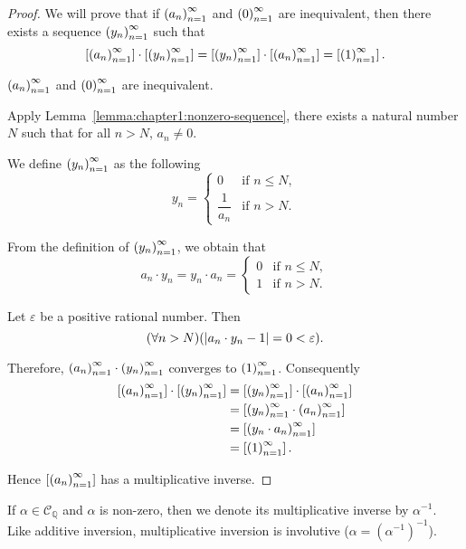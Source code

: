 \begin{proof}
    We will prove that if ${\left({a_{n}}\right)}^{\infty}_{n=1}$ and ${\left({0}\right)}^{\infty}_{n=1}$ are inequivalent, then there exists a sequence ${\left({y_{n}}\right)}^{\infty}_{n=1}$ such that
    \[
        \left[{{\left({a_{n}}\right)}^{\infty}_{n=1}}\right]\cdot\left[{{\left({y_{n}}\right)}^{\infty}_{n=1}}\right] = \left[{{\left({y_{n}}\right)}^{\infty}_{n=1}}\right]\cdot\left[{{\left({a_{n}}\right)}^{\infty}_{n=1}}\right] = \left[{{\left({1}\right)}^{\infty}_{n=1}}\right].
    \]

    ${\left({a_{n}}\right)}^{\infty}_{n=1}$ and ${\left({0}\right)}^{\infty}_{n=1}$ are inequivalent.

    Apply Lemma~\ref{lemma:chapter1:nonzero-sequence}, there exists a natural number $N$ such that for all $n > N$, $a_{n}\ne 0$.

    We define ${\left({y_{n}}\right)}^{\infty}_{n=1}$ as the following
    \[
        y_{n} = \begin{cases}
            0                & \text{if $n\le N$}, \\
            \dfrac{1}{a_{n}} & \text{if $n > N$}.
        \end{cases}
    \]

    From the definition of ${\left({y_{n}}\right)}^{\infty}_{n=1}$, we obtain that
    \[
        a_{n}\cdot y_{n} = y_{n}\cdot a_{n} = \begin{cases}
            0 & \text{if $n\le N$}, \\
            1 & \text{if $n > N$}.
        \end{cases}
    \]

    Let $\varepsilon$ be a positive rational number. Then
    \[
        (\forall n > N)(\left\vert{a_{n}\cdot y_{n} - 1}\right\vert = 0 < \varepsilon).
    \]

    Therefore, ${\left({a_{n}}\right)}^{\infty}_{n=1}\cdot {\left({y_{n}}\right)}^{\infty}_{n=1}$ converges to ${\left({1}\right)}^{\infty}_{n=1}$. Consequently
    \begin{align*}
        \left[{{\left({a_{n}}\right)}^{\infty}_{n=1}}\right]\cdot\left[{{\left({y_{n}}\right)}^{\infty}_{n=1}}\right] & = \left[{{\left({y_{n}}\right)}^{\infty}_{n=1}}\right]\cdot\left[{{\left({a_{n}}\right)}^{\infty}_{n=1}}\right] \\
                                                    & = \left[{{\left({y_{n}}\right)}^{\infty}_{n=1}\cdot{\left({a_{n}}\right)}^{\infty}_{n=1}}\right]         \\
                                                    & = \left[{{\left({y_{n}\cdot a_{n}}\right)}^{\infty}_{n=1}}\right]              \\
                                                    & = \left[{{\left({1}\right)}^{\infty}_{n=1}}\right].
    \end{align*}

    Hence $\left[{{\left({a_{n}}\right)}^{\infty}_{n=1}}\right]$ has a multiplicative inverse.
\end{proof}

If $\alpha\in\mathscr{C}_{\mathbb{Q}}$ and $\alpha$ is non-zero, then we denote its multiplicative inverse by ${\alpha}^{-1}$. Like additive inversion, multiplicative inversion is involutive ($\alpha = {\left({\alpha}^{-1}\right)}^{-1}$).

